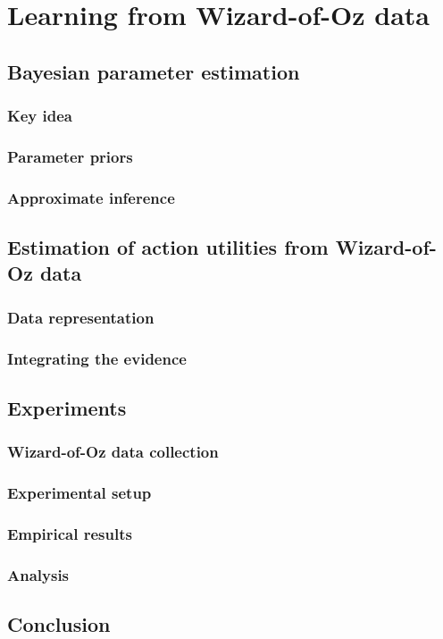 
\chapter{Learning from Wizard-of-Oz data}
\label{chap:wozlearning}

\section{Bayesian parameter estimation}

\subsection{Key idea}

\subsection{Parameter priors}


\subsection{Approximate inference}

\section{Estimation of action utilities from Wizard-of-Oz data}

\subsection{Data representation}

\subsection{Integrating the evidence}

\section{Experiments}
\label{sec:wozlearning-experiments}

\subsection{Wizard-of-Oz data collection}

\subsection{Experimental setup}

\subsection{Empirical results}

\subsection{Analysis}

\section{Conclusion}